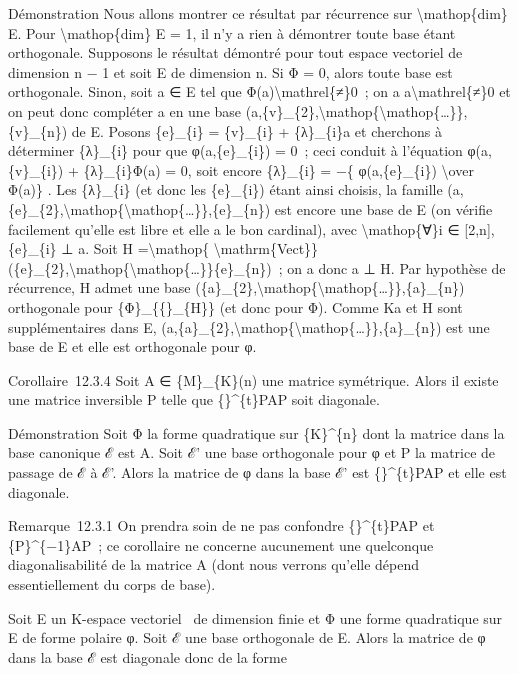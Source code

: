 \documentclass[]{article}
\begin{document}
Démonstration Nous allons montrer ce résultat par récurrence sur
\textbackslash{}mathop\{dim\} E. Pour \textbackslash{}mathop\{dim\} E =
1, il n'y a rien à démontrer toute base étant orthogonale. Supposons le
résultat démontré pour tout espace vectoriel de dimension n − 1 et soit
E de dimension n. Si Φ = 0, alors toute base est orthogonale. Sinon,
soit a ∈ E tel que Φ(a)\textbackslash{}mathrel\{≠\}0~; on a
a\textbackslash{}mathrel\{≠\}0 et on peut donc compléter a en une base
(a,\{v\}\_\{2\},\textbackslash{}mathop\{\textbackslash{}mathop\{\ldots{}\}\},\{v\}\_\{n\})
de E. Posons \{e\}\_\{i\} = \{v\}\_\{i\} + \{λ\}\_\{i\}a et cherchons à
déterminer \{λ\}\_\{i\} pour que φ(a,\{e\}\_\{i\}) = 0~; ceci conduit à
l'équation φ(a,\{v\}\_\{i\}) + \{λ\}\_\{i\}Φ(a) = 0, soit encore
\{λ\}\_\{i\} = −\{ φ(a,\{e\}\_\{i\}) \textbackslash{}over Φ(a)\} . Les
\{λ\}\_\{i\} (et donc les \{e\}\_\{i\}) étant ainsi choisis, la famille
(a,\{e\}\_\{2\},\textbackslash{}mathop\{\textbackslash{}mathop\{\ldots{}\}\},\{e\}\_\{n\})
est encore une base de E (on vérifie facilement qu'elle est libre et
elle a le bon cardinal), avec \textbackslash{}mathop\{∀\}i ∈ {[}2,n{]},
\{e\}\_\{i\} ⊥ a. Soit H =\textbackslash{}mathop\{
\textbackslash{}mathrm\{Vect\}\}(\{e\}\_\{2\},\textbackslash{}mathop\{\textbackslash{}mathop\{\ldots{}\}\}\{e\}\_\{n\})~;
on a donc a ⊥ H. Par hypothèse de récurrence, H admet une base
(\{a\}\_\{2\},\textbackslash{}mathop\{\textbackslash{}mathop\{\ldots{}\}\},\{a\}\_\{n\})
orthogonale pour \{Φ\}\_\{\{\textbar{}\}\_\{H\}\} (et donc pour Φ).
Comme Ka et H sont supplémentaires dans E,
(a,\{a\}\_\{2\},\textbackslash{}mathop\{\textbackslash{}mathop\{\ldots{}\}\},\{a\}\_\{n\})
est une base de E et elle est orthogonale pour φ.

Corollaire~12.3.4 Soit A ∈ \{M\}\_\{K\}(n) une matrice symétrique. Alors
il existe une matrice inversible P telle que \{\}\^{}\{t\}PAP soit
diagonale.

Démonstration Soit Φ la forme quadratique sur \{K\}\^{}\{n\} dont la
matrice dans la base canonique ℰ est A. Soit ℰ' une base orthogonale
pour φ et P la matrice de passage de ℰ à ℰ'. Alors la matrice de φ dans
la base ℰ' est \{\}\^{}\{t\}PAP et elle est diagonale.

Remarque~12.3.1 On prendra soin de ne pas confondre \{\}\^{}\{t\}PAP et
\{P\}\^{}\{−1\}AP~; ce corollaire ne concerne aucunement une quelconque
diagonalisabilité de la matrice A (dont nous verrons qu'elle dépend
essentiellement du corps de base).

Soit E un K-espace vectoriel ~de dimension finie et Φ une forme
quadratique sur E de forme polaire φ. Soit ℰ une base orthogonale de E.
Alors la matrice de φ dans la base ℰ est diagonale donc de la forme
\end{document}
